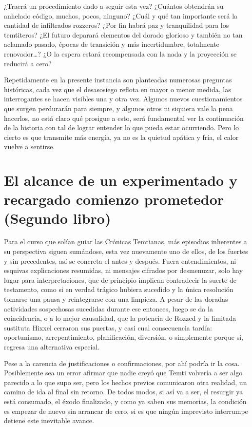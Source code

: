 \documentclass[
]{book}
\begin{document}
¿Traerá un procedimiento dado a seguir esta vez? ¿Cuántos obtendrán su anhelado código, muchos, pocos, ninguno? ¿Cuál y qué tan importante será la cantidad de infiltrados rozzeros? ¿Por fin habrá paz y tranquilidad para los temtiteros? ¿El futuro deparará elementos del dorado glorioso y también no tan aclamado pasado, épocas de transición y más incertidumbre, totalmente renovador\ldots? ¿O la espera estará recompensada con la nada y la proyección se reducirá a cero?

Repetidamente en la presente instancia son planteadas numerosas preguntas históricas, cada vez que el desasosiego reflota en mayor o menor medida, las interrogantes se hacen visibles una y otra vez. Algunos nuevos cuestionamientos que surgen perdurarán para siempre, y algunos otros ni siquiera vale la pena hacerlos, no está claro qué prosigue a esto, será fundamental ver la continuación de la historia con tal de lograr entender lo que pueda estar ocurriendo. Pero lo cierto es que transmite más energía, ya no es la quietud apática y fría, el calor vuelve a sentirse.

\hypertarget{el-alcance-de-un-experimentado-y-recargado-comienzo-prometedor-segundo-libro}{%
\chapter{El alcance de un experimentado y recargado comienzo prometedor (Segundo libro)}\label{el-alcance-de-un-experimentado-y-recargado-comienzo-prometedor-segundo-libro}}

Para el curso que solían guiar las Crónicas Temtianas, más episodios inherentes a su perspectiva siguen sumándose, esta vez nuevamente uno de ellos, de los fuertes y sin precedentes, así se concreta el antes y después. Fuera entendimientos, ni esquivas explicaciones resumidas, ni mensajes cifrados por desmenuzar, solo hay lugar para interpretaciones, que de principio implican contradecir la suerte de testamento, como si en verdad trágico hubiera sucedido y la única resolución tomarse una pausa y reintegrarse con una limpieza. A pesar de las doradas actividades sospechosas sucedidas durante ese entonces, luego se da la coincidencia, o a lo mejor causalidad, que la potencia de Rozzed y la limitada sustituta Hixxel cerraron sus puertas, y casi cual consecuencia tardía: oportunismo, arrepentimiento, planificación, diversión, o simplemente porque sí, regresa una alternativa especial.

Pese a la carencia de justificaciones o confirmaciones, por ahí podría ir la cosa. Posiblemente sea un error afirmar que nadie creyó que Temti volvería a ser algo parecido a lo que supo ser, pero los hechos previos comunicaron otra realidad, un camino de ida al final sin retorno. De todos modos, si así va a ser, el resurgir ya está consumado, el éxodo finalizado, y como ya saben sus memorias, la condición es empezar de nuevo sin arrancar de cero, si es que ningún imprevisto interrumpe detiene este inevitable avance.
\end{document}
